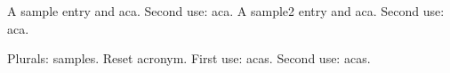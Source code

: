 \documentclass{article}
\begin{document}
A \gls{sample} entry and \gls{aca}. Second use: \gls{aca}.
A \gls{sample2} entry and \gls{aca}. Second use: \gls{aca}.

Plurals: \glspl{sample}. Reset acronym.
First use: \glspl{aca}. Second use: \glspl{aca}.

\printglossaries
\end{document}
